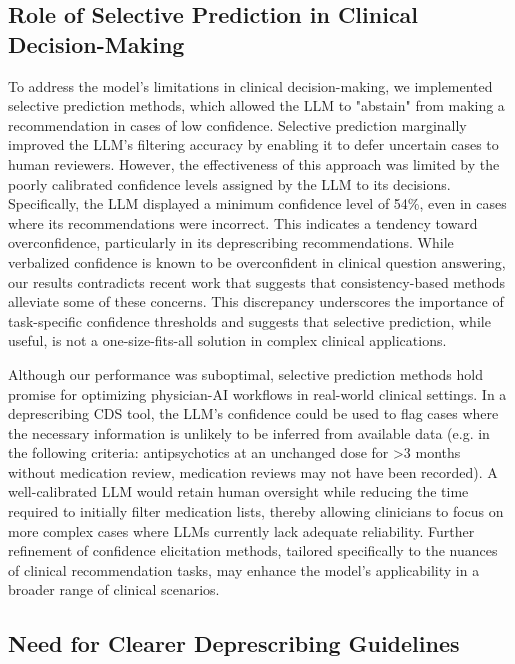 \subsection{Role of Selective Prediction in Clinical Decision-Making}

To address the model’s limitations in clinical decision-making, we implemented selective prediction methods, which allowed the LLM to "abstain" from making a recommendation in cases of low confidence. Selective prediction marginally improved the LLM's filtering accuracy by enabling it to defer uncertain cases to human reviewers. However, the effectiveness of this approach was limited by the poorly calibrated confidence levels assigned by the LLM to its decisions. Specifically, the LLM displayed a minimum confidence level of 54\%, even in cases where its recommendations were incorrect. This indicates a tendency toward overconfidence, particularly in its deprescribing recommendations. While verbalized confidence is known to be overconfident in clinical question answering, our results contradicts recent work that suggests that consistency-based methods alleviate some of these concerns\citep{savageLargeLanguageModel2024}. This discrepancy underscores the importance of task-specific confidence thresholds and suggests that selective prediction, while useful, is not a one-size-fits-all solution in complex clinical applications. 

Although our performance was suboptimal, selective prediction methods hold promise for optimizing physician-AI workflows in real-world clinical settings. In a deprescribing CDS tool, the LLM’s confidence could be used to flag cases where the necessary information is unlikely to be inferred from available data (e.g. in the following criteria: antipsychotics at an unchanged dose for >3 months without medication review, medication reviews may not have been recorded). A well-calibrated LLM would retain human oversight while reducing the time required to initially filter medication lists, thereby allowing clinicians to focus on more complex cases where LLMs currently lack adequate reliability. Further refinement of confidence elicitation methods, tailored specifically to the nuances of clinical recommendation tasks, may enhance the model’s applicability in a broader range of clinical scenarios.

\subsection{Need for Clearer Deprescribing Guidelines}

